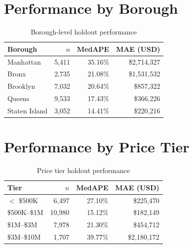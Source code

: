 \documentclass[11pt, a4paper, twoside]{report}
\begin{document}
\section{Performance by Borough}
\begin{table}[H]
  \centering
  \caption{Borough-level holdout performance}
  \begin{tabular}{lrrr}
    \toprule
    Borough & $n$ & MedAPE & MAE (USD) \\
    \midrule
    Manhattan     & 5,411 & 35.16\% & \$2,714,327 \\
    Bronx         & 2,735 & 21.08\% & \$1,531,532 \\
    Brooklyn      & 7,032 & 20.64\% &   \$857,322 \\
    Queens        & 9,533 & 17.43\% &   \$366,226 \\
    Staten Island & 3,052 & 14.41\% &   \$220,216 \\
    \bottomrule
  \end{tabular}
\end{table}

\section{Performance by Price Tier}
\begin{table}[H]
  \centering
  \caption{Price tier holdout performance}
  \begin{tabular}{lrrr}
    \toprule
    Tier & $n$ & MedAPE & MAE (USD) \\
    \midrule
    $<$ \$500K      &  6,497 & 27.10\% &   \$225,470 \\
    \$500K--\$1M    & 10,980 & 15.12\% &   \$182,149 \\
    \$1M--\$3M      &  7,978 & 21.30\% &   \$454,712 \\
    \$3M--\$10M     &  1,707 & 39.77\% & \$2,180,172 \\
    \bottomrule
  \end{tabular}
\end{table}
\end{document}
